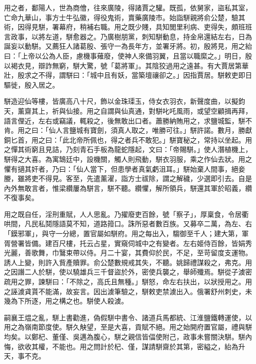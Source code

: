 \begin{pinyinscope}
 用之者，鄱陽人，世為商儈，往來廣陵，得諸賈之驩。既孤，依舅家，盜私其室，亡命九華山，事方士牛弘徽，得役鬼術，賣藥廣陵市。始詣駢親將俞公楚，驗其術，因得見駢，署幕府，稍補右職。用之既少賤，具知閭里利病、吏得失，頗班班言政事，以將左道，駢愈器之。乃廣樹朋黨，刺知駢動息，持金帛還結左右，日為誕妄以動駢。又薦狂人諸葛殷、張守一為長年方，並署牙將。初，殷將見，用之紿曰：「上帝以公為人臣，慮機事薙廢，使神人來備羽翼，且當以職縻之。」明日，殷以褐衣見，辯詐無窮，駢大驚，號「葛將軍」。其陰狡過用之遠甚。有大賈居第華壯，殷求之不得，謂駢曰：「城中且有妖，當築壇禳卻之。」因指賈居。駢敕吏即日驅徙，殷入居之。



 駢造迎仙等樓，皆廣高八十尺，飾以金珠璖玉，侍女衣羽衣，新聲度曲，以擬鈞天，薰齋其上，祈與仙接。用之自謂與仙真通，對駢叱吒風雨，或望空顧揖再拜，語言俚近，左右或竊議，輒殺之，後無敢出口者。蕭勝納賄用之，求鹽城監，駢不肯。用之曰：「仙人言鹽城有寶劍，須真人取之，唯勝可往。」駢許諾。數月，勝獻銅匕首，用之曰：「此北帝所佩也，得之者兵不敢犯。」駢寶秘之，常持以坐起。用之憚其術窮且見詰，乃刻青石手板為龍蛇隱起，文曰：「帝賜駢。」使人潛植機上，駢得之大喜。為寓鵠廷中，設機關，觸人則飛動，駢衣羽服，乘之作仙去狀。用之懼有擿其奸者，乃曰：「仙人當下，但患學者真氣虧沮耳。」駢始棄人間事，絕妾媵，雖將吏不得見。客至，先遣薰濯，詣方士祓除，謂之解穢，少選即引去。自是內外無敢言者，惟梁纘屢為駢言，駢不聽。纘懼，解所領兵，駢還其軍於昭義，纘不復事矣。



 用之既自任，淫刑重賦，人人思亂。乃擢廢吏百餘，號「察子」，厚稟食，令居衢哄間，凡民私鬩隱語莫不知，道路箝口。誅所惡者數百族。又募卒二萬，為左、右「鏌邪軍」，與守一分總，置官屬如駢府。用之每出入，騶御至千人；建大第，軍胥營署皆備。建百尺樓，托云占星，實窺伺城中之有變者。左右姬侍百餘，皆娟秀光麗，善歌舞，巾鷖束帶以侍。月二十宴，其費仰於民，不足，至苛留度支運物。誘人上變，則許入貲產贖罪。俞公楚數規戒其失，不聽。姚歸禮謀殺之，弗克。用之因譖二人於駢，使以驍雄兵三千督盜於外，密使兵襲之，舉師殲焉。駢從子澞密疏用之罪，諫駢曰：「不除之，高氏且無種。」駢怒，命左右扶出，以狀授用之。用之誣澞貣貰不能滿，故妄言。因出澞筆驗之，駢敕吏禁澞出入。俄署舒州刺史，未幾為下所逐，用之構之也。駢使人殺澞。



 嗣襄王煴之亂，駢上書勸進，偽假駢中書令、諸道兵馬都統、江淮鹽鐵轉運使，以用之為嶺南節度使。駢久觖望，至是大喜，貢賦不絕。用之始開府置官屬，禮與駢均矣。以鄭杞、董僅、吳邁為腹心，駢之親信皆偪使附己，政事未嘗關決駢。駢內悔，欲收其權，不能也。用之問計於杞、僅，謀請駢齋於其第，密縊之，紿為升天，事不克。




\end{pinyinscope}
